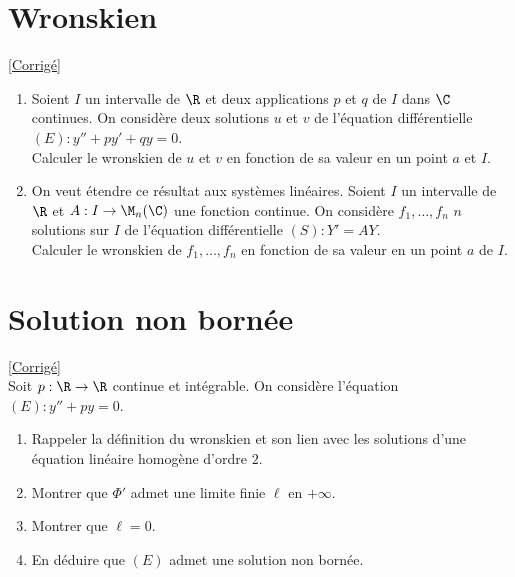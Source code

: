 \documentclass{book}
\begin{document}
\section{Wronskien}
\textcolor{blue}{\hyperref[sec:wronskien]{[Corrigé]}}\\
\label{Wronskien}
\begin{enumerate}[leftmargin=*]
	\item
	Soient $I$ un intervalle de $\R$ et deux applications $p$ et $q$ de $I$ dans $\C$ continues. On considère deux solutions $u$ et $v$ de l'équation différentielle $(E): y''+py'+qy=0.$ 
	\\Calculer le wronskien de $u$ et $v$ en fonction de sa valeur en un point $a$ et $I$.
	\item On veut étendre ce résultat aux systèmes linéaires. Soient $I$ un intervalle de $\R$ et $A:I\to\M_n(\C)$ une fonction continue. On considère $f_1,\dots,f_n$ $n$ solutions sur $I$ de l'équation différentielle $(S):Y'=AY$.
	\\Calculer le wronskien de $f_1,\dots,f_n$ en fonction de sa valeur en un point $a$ de $I$.
\end{enumerate}

\section{Solution non bornée }
\textcolor{blue}{\hyperref[Solution non bornée corrigé]{[Corrigé]}}\\
\label{Solution non bornée}
Soit $p:\R\to \R$ continue et intégrable. On considère l'équation $(E) : y''+py=0$.
\begin{enumerate}
	\item Rappeler la définition du wronskien et son lien avec les solutions d'une équation linéaire homogène d'ordre $2$.
	\item Montrer que $\Phi'$ admet une limite finie $\ell$ en $+\infty$.
	\item Montrer que $\ell=0$.
	\item En déduire que $(E)$ admet une solution non bornée.
\end{enumerate}
\end{document}
